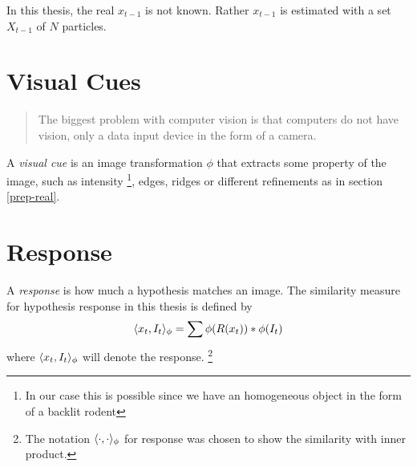 
In this thesis, the real $x_{t-1}$ is not known. Rather $x_{t-1}$ is
estimated with a set $X_{t-1}$ of $N$ particles.

\section{Visual Cues}
\begin{quote}
    The biggest problem with computer vision is that computers do not have
    vision, only a data input device in the form of a camera.
\end{quote}
A \emph{visual cue} is an image transformation $\phi$ that extracts
some property of the image, such as intensity
\footnote{In our case this is possible since we have an homogeneous object
in the form of a backlit rodent}, edges, ridges\cite{Hedvig} or different 
refinements as in section \ref{prep-real}.

\section{Response}
\label{sec:response}

\begin{definition}
  A \emph{response} is how much a hypothesis matches an image. The
  similarity measure for hypothesis response in this thesis is defined
  by
    \begin{equation}
        \label{eq:response}
        \langle x_t, I_t\rangle_{\phi} = \sum{\phi(R(x_t))*\phi(I_t)}
    \end{equation}
    where $\langle x_t, I_t\rangle_{\phi}$ will denote the response.
    \footnote{The notation $\langle \cdot, \cdot\rangle_{\phi}$ for
      response was chosen to show the similarity with inner product.}

\end{definition}

